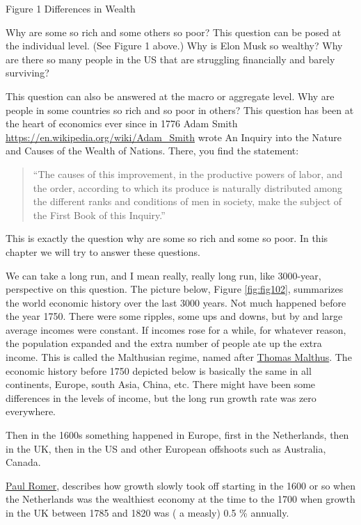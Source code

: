 \documentclass[
]{book}
\begin{document}
Figure 1 Differences in Wealth

Why are some so rich and some others so poor? This question can be posed at the individual level. (See Figure 1 above.) Why is Elon Musk so wealthy? Why are there so many people in the US that are struggling financially and barely surviving?

This question can also be answered at the macro or aggregate level. Why are people in some countries so rich and so poor in others? This question has been at the heart of economics ever since in 1776 Adam Smith \url{https://en.wikipedia.org/wiki/Adam_Smith} wrote An Inquiry into the Nature and Causes of the Wealth of Nations. There, you find the statement:

\begin{quote}
``The causes of this improvement, in the productive powers of labor, and the order, according to which its produce is naturally distributed among the different ranks and conditions of men in society, make the subject of the First Book of this Inquiry.''
\end{quote}

This is exactly the question why are some so rich and some so poor. In this chapter we will try to answer these questions.

We can take a long run, and I mean really, really long run, like 3000-year, perspective on this question. The picture below, Figure \ref{fig:fig102}, summarizes the world economic history over the last 3000 years. Not much happened before the year 1750. There were some ripples, some ups and downs, but by and large average incomes were constant. If incomes rose for a while, for whatever reason, the population expanded and the extra number of people ate up the extra income. This is called the Malthusian regime, named after \href{https://en.wikipedia.org/wiki/Thomas_Robert_Malthus}{Thomas Malthus}. The economic history before 1750 depicted below is basically the same in all continents, Europe, south Asia, China, etc. There might have been some differences in the levels of income, but the long run growth rate was zero everywhere.

Then in the 1600s something happened in Europe, first in the Netherlands, then in the UK, then in the US and other European offshoots such as Australia, Canada.

\href{https://en.wikipedia.org/wiki/Paul_Romer}{Paul Romer}, describes how growth slowly took off starting in the 1600 or so when the Netherlands was the wealthiest economy at the time to the 1700 when growth in the UK between 1785 and 1820 was ( a measly) 0.5 \% annually.
\end{document}
